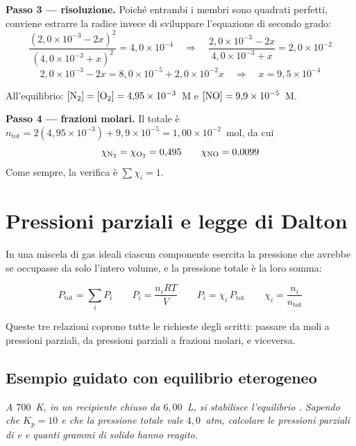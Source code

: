 \documentclass[11pt, a4paper, openright]{book}
\begin{document}
\noindent\textbf{Passo 3 --- risoluzione.} Poiché entrambi i membri sono quadrati
perfetti, conviene estrarre la radice invece di sviluppare l'equazione di secondo grado:
\begin{equation*}
  \frac{(2{,}0\times10^{-3}-2x)^2}{(4{,}0\times10^{-3}+x)^2} = 4{,}0\times10^{-4}
  \quad\Longrightarrow\quad
  \frac{2{,}0\times10^{-3}-2x}{4{,}0\times10^{-3}+x} = 2{,}0\times10^{-2}
\end{equation*}
\begin{equation*}
  2{,}0\times10^{-3} - 2x = 8{,}0\times10^{-5} + 2{,}0\times10^{-2}x
  \quad\Longrightarrow\quad
  x = 9{,}5\times10^{-4}
\end{equation*}

All'equilibrio:
$[\ce{N2}] = [\ce{O2}] = 4{,}95\times10^{-3}$~M e $[\ce{NO}] = 9{,}9\times10^{-5}$~M.

\medskip
\noindent\textbf{Passo 4 --- frazioni molari.} Il totale è
$n_{\text{tot}} = 2(4{,}95\times10^{-3}) + 9{,}9\times10^{-5} = 1{,}00\times10^{-2}$~mol,
da cui
\begin{equation*}
  \chi_{\ce{N2}} = \chi_{\ce{O2}} = 0{,}495
  \qquad
  \chi_{\ce{NO}} = 0{,}0099
\end{equation*}
Come sempre, la verifica è $\sum \chi_i = 1$.


\section{Pressioni parziali e legge di Dalton}

In una miscela di gas ideali ciascun componente esercita la pressione che avrebbe se
occupasse da solo l'intero volume, e la pressione totale è la loro somma:

\begin{equation}
  P_{\text{tot}} = \sum_i P_i
  \qquad
  P_i = \frac{n_i RT}{V}
  \qquad
  P_i = \chi_i \, P_{\text{tot}}
  \qquad
  \chi_i = \frac{n_i}{n_{\text{tot}}}
\end{equation}

Queste tre relazioni coprono tutte le richieste degli scritti: passare da moli a pressioni
parziali, da pressioni parziali a frazioni molari, e viceversa.

\subsection{Esempio guidato con equilibrio eterogeneo}

\emph{A $700$~K, in un recipiente chiuso da $6{,}00$~L, si stabilisce l'equilibrio
. Sapendo che $K_p = 10$ e che la pressione totale vale
$4{,}0$~atm, calcolare le pressioni parziali di  e  e quanti grammi di
solido hanno reagito.}
\end{document}
